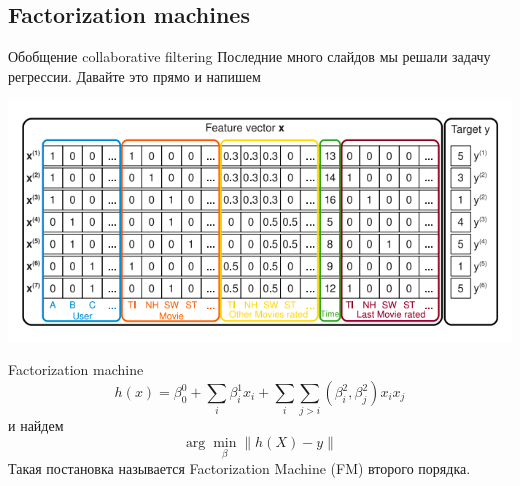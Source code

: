 \documentclass[14pt, fleqn, xcolor={dvipsnames, table}]{beamer}
\begin{document}
\subsection{Factorization machines} %

\begin{frame}{Обобщение collaborative filtering}
Последние много слайдов мы решали задачу регрессии. Давайте это прямо и напишем
\begin{center}
\includegraphics[width=1\textwidth]{FMSetup.png}
\end{center}
\end{frame}

\begin{frame}{Factorization machine}
\small
$$
h(x) = \beta_0^0 + \sum_i \beta_i^1 x_i + \sum_i \sum_{j > i} (\beta_i^2, \beta_j^2)x_i x_j
$$
и найдем
$$
\arg \min_\beta \|h(X) - y\|
$$
Такая постановка называется Factorization Machine (FM) второго порядка.
\end{frame}
\end{document}
